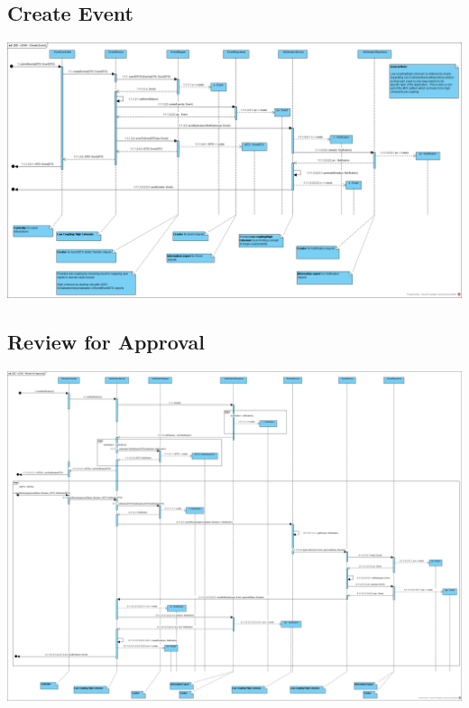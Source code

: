 \documentclass{article}
\begin{document}
\subsection{Create Event}
        \includegraphics[scale=0.34]{images/SD-UC04-CreateEvent.png}
        \label{fig:SD-CreateEvent}
\subsection{Review for Approval}
        \includegraphics[scale=0.27]{images/SD-UC09-ReviewForApproval.png}
        \label{fig:SD-ReviewForApproval}
\end{document}
